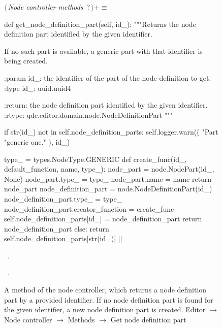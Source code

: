 \documentclass[%
    a4paper,    %
    justified,  %
    nobib,      %
    openany     %
]{tufte-book}
\makeatletter
\renewcommand{\label}[1]{\@tufte@label{##1}}%
\makeatother
\begin{document}
\begin{figure}
\begin{flushleft} \small
\begin{minipage}{\linewidth}\label{scrap128}\raggedright\small
{} $\langle\,${\itshape Node controller methods}\nobreak\ {\footnotesize {?}}$\,\rangle+\equiv$
\vspace{-1ex}
\begin{pythoncode}
def get_node_definition_part(self, id_):
    """Returns the node definition part identified by the given identifier.

    If no such part is available, a generic part with that identifier is being
    created.

    :param id_: the identifier of the part of the node definition to get.
    :type  id_: uuid.uuid4

    :return: the node definition part identified by the given identifier.
    :rtype: qde.editor.domain.node.NodeDefinitionPart
    """

    if str(id_) not in self.node_definition_parts:
        self.logger.warn((
            "Part %
            "generic one."
        ), id_)

        type_ = types.NodeType.GENERIC
        def create_func(id_, default_function, name, type_):
            node_part = node.NodePart(id_, None)
            node_part.type_ = type_
            node_part.name = name
            return node_part
        node_definition_part = node.NodeDefinitionPart(id_)
        node_definition_part.type_ = type_
        node_definition_part.creator_function = create_func
        self.node_definition_parts[id_] = node_definition_part
        return node_definition_part
    else:
        return self.node_definition_parts[str(id_)]
|\NWsep|
\end{pythoncode}
\vspace{1.5ex}
\footnotesize
\begin{list}{}{\setlength{\itemsep}{-\parsep}\setlength{\itemindent}{-\leftmargin}}
\item \NWtxtMacroDefBy\ .
\item \NWtxtMacroRefIn\ .

\item{}
\end{list}
\end{minipage}\vspace{4ex}
\end{flushleft}
\caption{A method of the node controller, which returns a node definition part
  by a provided identifier. If no node definition part is found for the given
  identifier, a new node definition part is created.
  \newline{}\newline{}Editor $\rightarrow$ Node controller $\rightarrow$
  Methods $\rightarrow$ Get node definition part}
\label{editor:lst:node-controller:methods:get-node-definition-part}
\end{figure}
\end{document}
